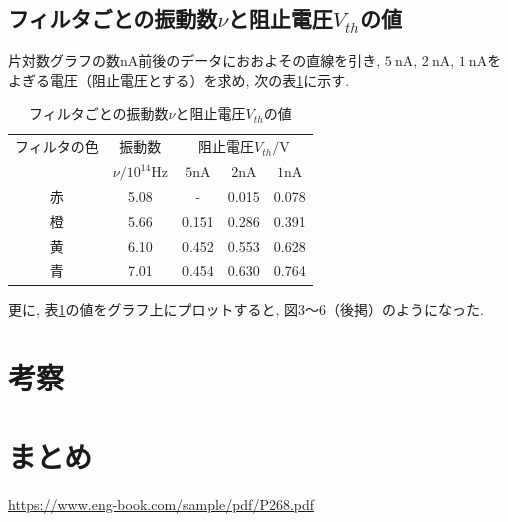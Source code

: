 \documentclass{jarticle}
\begin{document}
\subsection{フィルタごとの振動数$\nu$と阻止電圧$V_{th}$の値}

片対数グラフの数$\mathrm{nA}$前後のデータにおおよその直線を引き, $5\ \mathrm{nA}$, $2\ \mathrm{nA}$, $1\ \mathrm{nA}$をよぎる電圧（阻止電圧とする）を求め, 次の表\ref{tb:blocking-voltage}に示す.

\begin{table}[H]
  \centering
  \caption{フィルタごとの振動数$\nu$と阻止電圧$V_{th}$の値}
  \label{tb:blocking-voltage}
  \begin{tabular}{ccccc}
    \hline
    フィルタの色 & 振動数 & \multicolumn{3}{c}{阻止電圧$V_{th}/\mathrm{V}$} \\
    & $\nu/10^{14}\mathrm{Hz}$ & $5\mathrm{nA}$ & $2\mathrm{nA}$ & $1\mathrm{nA}$ \\
    \hline
    赤 & 5.08 & - & 0.015 & 0.078 \\
    橙 & 5.66 & 0.151 & 0.286 & 0.391 \\
    黄 & 6.10 & 0.452 & 0.553 & 0.628 \\
    青 & 7.01 & 0.454 & 0.630 & 0.764 \\
    \hline
  \end{tabular}
\end{table}

更に, 表\ref{tb:blocking-voltage}の値をグラフ上にプロットすると, 図3～6（後掲）のようになった.




\section{考察}



\section{まとめ}



\begin{thebibliography}{99}

   \url{https://www.eng-book.com/sample/pdf/P268.pdf}

\end{thebibliography}
\end{document}
